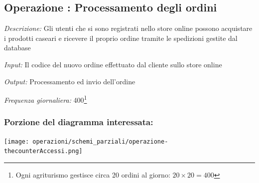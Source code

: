 \documentclass[12pt,a4paper]{article}
\begin{document}
\subsection*{Operazione \thecounterAccessi{}: Processamento degli ordini}
\noindent\textit{Descrizione:} Gli utenti che si sono registrati nello store online possono acquistare i prodotti caseari e ricevere il proprio ordine tramite le spedizioni gestite dal database

\noindent\textit{Input:} Il codice del nuovo ordine effettuato dal cliente sullo store online

\noindent\textit{Output:} Processamento ed invio dell'ordine

\noindent\textit{Frequenza giornaliera:} 400\footnote{Ogni agriturismo gestisce circa 20 ordini al giorno: $20\times 20= 400$}

\subsubsection*{Porzione del diagramma interessata:}

\texttt{[image: operazioni/schemi\_parziali/operazione-\\thecounterAccessi.png]} 
\end{document}
